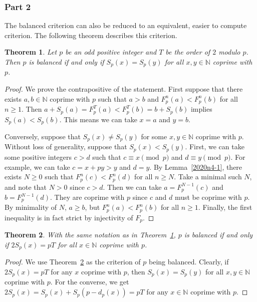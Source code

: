 \documentclass{article}
\newtheorem{theorem}{Theorem}
\newcommand{\N}{\mathbb{N}}
\begin{document}
\subsubsection*{Part 2}

The balanced criterion can also be reduced to an equivalent, easier to compute criterion.
The following theorem describes this criterion.

\begin{theorem}\label{2020n4-3}
Let $p$ be an odd positive integer and $T$ be the order of $2$ modulo $p$.
Then $p$ is balanced if and only if $S_p(x) = S_p(y)$ for all $x, y \in \N$ coprime with $p$.
\end{theorem}
\begin{proof}
We prove the contrapositive of the statement.
First suppose that there exists $a, b \in \N$ coprime with $p$ such that $a > b$ and $F_p^n(a) < F_p^n(b)$ for all $n \geq 1$.
Then $a + S_p(a) = F_p^T(a) < F_p^T(b) = b + S_p(b)$ implies $S_p(a) < S_p(b)$.
This means we can take $x = a$ and $y = b$.

Conversely, suppose that $S_p(x) \neq S_p(y)$ for some $x, y \in \N$ coprime with $p$.
Without loss of generality, suppose that $S_p(x) < S_p(y)$.
First, we can take some positive integers $c > d$ such that $c \equiv x \pmod{p}$ and $d \equiv y \pmod{p}$.
For example, we can take $c = x + py > y$ and $d = y$.
By Lemma~\ref{2020n4-1}, there exists $N \geq 0$ such that $F_p^n(c) < F_p^n(d)$ for all $n \geq N$.
Take a minimal such $N$, and note that $N > 0$ since $c > d$.
Then we can take $a = F_p^{N - 1}(c)$ and $b = F_p^{N - 1}(d)$.
They are coprime with $p$ since $c$ and $d$ must be coprime with $p$.
By minimality of $N$, $a \geq b$, but $F_p^n(a) < F_p^n(b)$ for all $n \geq 1$.
Finally, the first inequality is in fact strict by injectivity of $F_p$. 
\end{proof}

\begin{theorem}\label{2020n4-4}
With the same notation as in Theorem~\ref{2020n4-3}, $p$ is balanced if and only if $2 S_p(x) = pT$ for all $x \in \N$ coprime with $p$.
\end{theorem}
\begin{proof}
We use Theorem~\ref{2020n4-4} as the criterion of $p$ being balanced.
Clearly, if $2 S_p(x) = pT$ for any $x$ coprime with $p$, then $S_p(x) = S_p(y)$ for all $x, y \in \N$ coprime with $p$.
For the converse, we get $2 S_p(x) = S_p(x) + S_p(p - d_p(x)) = pT$ for any $x \in \N$ coprime with $p$.
\end{proof}
\end{document}

